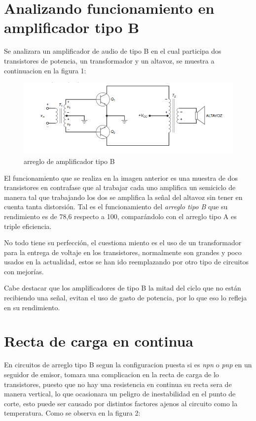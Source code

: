\documentclass[11pt,a4paper]{article}
\begin{document}
\section{Analizando funcionamiento en amplificador tipo B}

Se analizara un amplificador de audio de tipo B en el cual participa dos transistores de potencia, un transformador y un altavoz, se muestra a continuacion en la figura 1: \cite{malvino1991principios}

\begin{figure}[h]
\begin{center}
\includegraphics[scale=0.7]{2.png}
\caption{arreglo de amplificador tipo B}
\end{center}
\end{figure}

El funcionamiento que se realiza en la imagen anterior es una muestra de dos transistores en contrafase que al trabajar cada uno amplifica un semiciclo de manera tal que trabajando los dos se amplifica la señal del altavoz sin tener en cuenta tanta distorsión. Tal es el funcionamiento del \emph{arreglo tipo B} que su rendimiento es de 78,6 respecto a 100, comparándolo con el arreglo tipo A es triple eficiencia.

No todo tiene su perfección, el cuestiona miento es el uso de un transformador para la entrega de voltaje en los transistores, normalmente son grandes y poco usados en la actualidad, estos se han ido reemplazando por otro tipo de circuitos con mejorías.

Cabe destacar que los amplificadores de tipo B la mitad del ciclo que no están recibiendo una señal, evitan el uso de gasto de potencia, por lo que eso lo refleja en su rendimiento.

\newpage

\section{Recta de carga en continua}

En circuitos de arreglo tipo B segun la configuracion puesta si es \emph{npn} o \emph{pnp} en un seguidor de emisor, tomara una complicacion en la recta de carga de lo transistores, puesto que no hay una resistencia en continua su recta sera de manera vertical, lo que ocasionara un peligro de inestabilidad en el punto de corte, esto puede ser causado por distintos factores ajenos al circuito como la temperatura. Como se observa en la figura 2: \cite{malvino1991principios}
\end{document}
